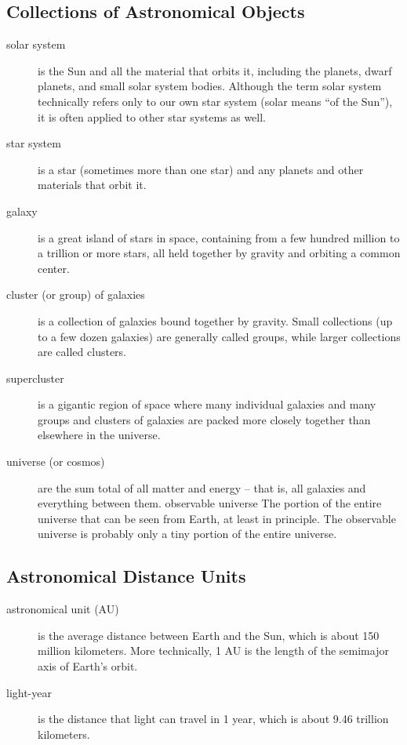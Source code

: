 \subsection{Collections of Astronomical Objects}
\begin{description}
\item[solar system] is the Sun and all the material that orbits it, including the planets, dwarf planets, and small solar system bodies. Although the term solar system technically refers only to our own star system (solar means “of the Sun”), it is often applied to other star systems as well.
\item[star system] is a star (sometimes more than one star) and any planets and other materials that orbit it.
\item[galaxy] is a great island of stars in space, containing from a few hundred million to a trillion or more stars, all held together by gravity and
orbiting a common center.
\item[cluster (or group) of galaxies] is a collection of galaxies bound together by gravity. Small collections (up to a few dozen galaxies)
are generally called groups, while larger collections are called clusters.
\item[supercluster] is a gigantic region of space where many individual galaxies and many groups and clusters of galaxies are packed more
closely together than elsewhere in the universe.
\item[universe (or cosmos)] are the sum total of all matter and energy -- that is, all galaxies and everything between them.
observable universe The portion of the entire universe that can be seen from Earth, at least in principle. The observable universe is
probably only a tiny portion of the entire universe.
\end{description}

\subsection{Astronomical Distance Units}
\begin{description}
\item[astronomical unit (AU)] is the average distance between Earth and the Sun, which is about 150 million kilometers. More technically,
1 AU is the length of the semimajor axis of Earth’s orbit.
\item[light-year] is the distance that light can travel in 1 year, which is about 9.46 trillion kilometers.
\end{description}

